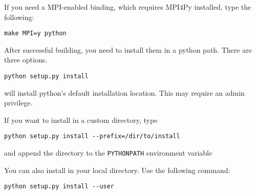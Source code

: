 If you need a MPI-enabled binding, which requires MPI4Py installed, type the following:

\begin{lstlisting}
make MPI=y python
\end{lstlisting}

After successful building, you need to install them in a python path. There are three options.

\begin{lstlisting}
python setup.py install
\end{lstlisting}
will install python's default installation location. This may require an admin privilege.

If you want to install in a custom directory, type
\begin{lstlisting}
python setup.py install --prefix=/dir/to/install
\end{lstlisting}
and append the directory to the \verb+PYTHONPATH+ environment variable

You can also install in your local directory. Use the following command:
\begin{lstlisting}
python setup.py install --user
\end{lstlisting}

